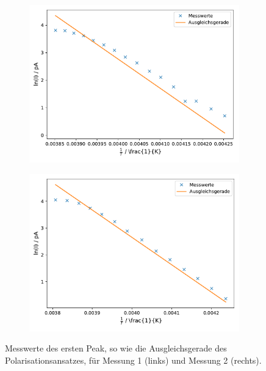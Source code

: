 \begin{figure}
    \centering
    \begin{subfigure}[b]{0.49\textwidth}
        \centering
        \includegraphics[width= \textwidth]{plots/asc_1.5grad.pdf}
    \end{subfigure}
    \hfill
    \begin{subfigure}[b]{0.49\textwidth}
        \centering
        \includegraphics[width= \textwidth]{plots/asc_2grad.pdf}
    \end{subfigure}
    \caption{Messwerte des ersten Peak, so wie die Ausgleichsgerade des Polarisationsansatzes, für Messung 1 (links) und Messung 2 (rechts).}
    \label{fig:3}
\end{figure}




